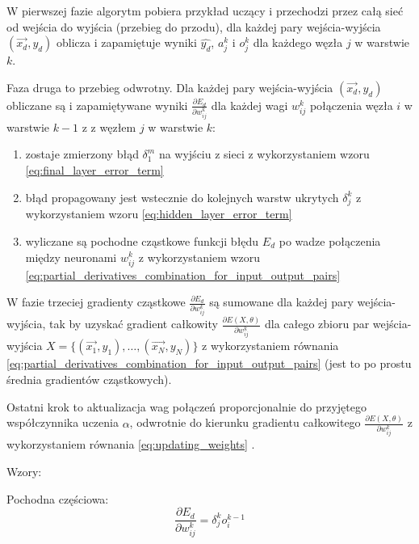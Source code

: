 \documentclass[a4paper,12pt]{article}
\numberwithin{figure}{section}
\begin{document}
    \bigskip

    W pierwszej fazie algorytm pobiera przykład uczący i przechodzi przez całą sieć od wejścia do wyjścia (przebieg do przodu), dla każdej pary wejścia-wyjścia $(\vec{x_d}, y_d)$ oblicza i zapamiętuje wyniki $\widehat{y_d}$, $a_j^k$ i $o_j^k$ dla każdego węzła $j$ w warstwie $k$.

    \bigskip

    Faza druga to przebieg odwrotny. Dla każdej pary wejścia-wyjścia $(\vec{x_d}, y_d)$ obliczane są i zapamiętywane wyniki $\frac{\partial E_d}{\partial w_{ij}^k}$ dla każdej wagi $w_{ij}^k$ połączenia węzła $i$ w warstwie $k-1$ z z węzłem $j$ w warstwie $k$:
    \begin{enumerate}
        \item zostaje zmierzony błąd $\delta_1^m$ na wyjściu z sieci z wykorzystaniem wzoru \ref{eq:final_layer_error_term}
        \item błąd propagowany jest wstecznie do kolejnych warstw ukrytych $\delta_j^k$ z wykorzystaniem wzoru \ref{eq:hidden_layer_error_term}
        \item wyliczane są pochodne cząstkowe funkcji błędu $E_d$ po wadze połączenia między neuronami $w_{ij}^k$ z wykorzystaniem wzoru \ref{eq:partial_derivatives_combination_for_input_output_pairs}
    \end{enumerate}

    \bigskip

    W fazie trzeciej gradienty cząstkowe $\frac{\partial E_d}{\partial w_{ij}^k}$ są sumowane dla każdej pary wejścia-wyjścia, tak by uzyskać gradient całkowity $\frac{\partial E(X,\theta)}{\partial w_{ij}^k}$ dla całego zbioru par wejścia-wyjścia $X = \{(\vec{x_1}, y_1),\dotsc,(\vec{x_N}, y_N)\}$ z wykorzystaniem równania \ref{eq:partial_derivatives_combination_for_input_output_pairs} (jest to po prostu średnia gradientów cząstkowych).

    \bigskip

    Ostatni krok to aktualizacja wag połączeń proporcjonalnie do przyjętego współczynnika uczenia $\alpha$, odwrotnie do kierunku gradientu całkowitego $\frac{\partial E(X,\theta)}{\partial w_{ij}^k}$ z wykorzystaniem równania \ref{eq:updating_weights} \cite{BackpropagationBrilliant}.

    \bigskip

    Wzory:

    \bigskip

    \noindent
    \begin{minipage}[H]{\textwidth}
        \setlength\parindent{17pt} Pochodna częściowa: \\
        \begin{equation}
            \label{eq:error_func_partial_derivatives}
            \frac{\partial E_d}{\partial w_{ij}^k} = \delta_j^k o_i^{k-1}
        \end{equation}
    \end{minipage}
\end{document}
